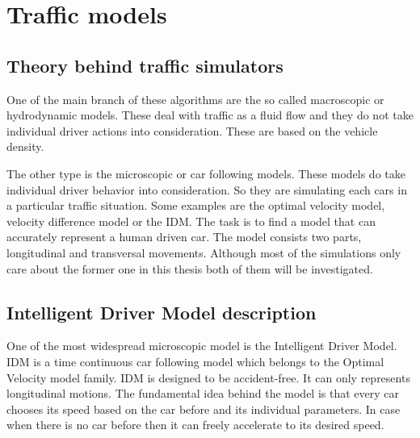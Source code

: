 \documentclass[a4paper,11pt,twoside]{report}
\begin{document}
	\chapter{Traffic models}
		\section{Theory behind traffic simulators}
			One of the main branch of these algorithms are the so called macroscopic or hydrodynamic models. These deal with traffic as a fluid flow and they do not take individual driver actions into consideration. These are based on the vehicle density.

			The other type is the microscopic or car following models. These models do take individual driver behavior into consideration. So they are simulating each cars in a particular traffic situation. Some examples are the optimal velocity model, velocity difference model or the IDM. The task is to find a model that can accurately represent a human driven car. The model consists two parts, longitudinal and transversal movements. Although most of the simulations only care about the former one in this thesis both of them will be investigated.
		\section{Intelligent Driver Model description} \label{sec:IDM}
			One of the most widespread microscopic model is the Intelligent Driver Model. IDM is a time continuous car following model which belongs to the Optimal Velocity model family. IDM is designed to be accident-free. It can only represents longitudinal motions. The fundamental idea behind the model is that every car chooses its speed based on the car before and its individual parameters. In case when there is no car before then it can freely accelerate to its desired speed.
\end{document}
